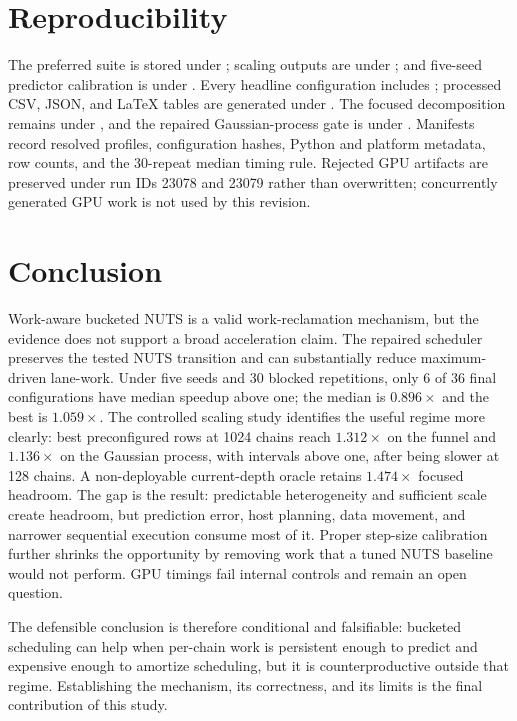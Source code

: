 \documentclass[conference]{IEEEtran}
\begin{document}
\section{Reproducibility}

The preferred suite is stored under
; scaling outputs are under
; and five-seed predictor calibration
is under .  Every
headline configuration includes ; processed CSV,
JSON, and LaTeX tables are generated under
.  The focused decomposition remains
under , and the repaired
Gaussian-process gate is under
.  Manifests record resolved
profiles, configuration hashes, Python and platform metadata, row counts, and
the 30-repeat median timing rule.  Rejected GPU artifacts are preserved under
run IDs 23078 and 23079 rather than overwritten; concurrently generated GPU
work is not used by this revision.

\section{Conclusion}

Work-aware bucketed NUTS is a valid work-reclamation mechanism, but the
evidence does not support a broad acceleration claim.  The repaired scheduler
preserves the tested NUTS transition and can substantially reduce maximum-driven
lane-work.  Under five seeds and 30 blocked repetitions, only 6 of 36 final
configurations have median speedup above one; the median is $0.896\times$ and
the best is $1.059\times$.  The controlled scaling study identifies the useful
regime more clearly: best preconfigured rows at 1024 chains reach
$1.312\times$ on the funnel and $1.136\times$ on the Gaussian process, with
intervals above one, after being slower at 128 chains.  A non-deployable
current-depth oracle retains $1.474\times$ focused headroom.  The gap is the
result: predictable heterogeneity and sufficient scale create headroom, but
prediction error, host planning, data movement, and narrower sequential
execution consume most of it.  Proper step-size calibration further
shrinks the opportunity by removing work that a tuned NUTS baseline would not
perform.  GPU timings fail internal controls and remain an open question.

The defensible conclusion is therefore conditional and falsifiable: bucketed
scheduling can help when per-chain work is persistent enough to predict and
expensive enough to amortize scheduling, but it is counterproductive outside
that regime.  Establishing the mechanism, its correctness, and its limits is
the final contribution of this study.
\end{document}
